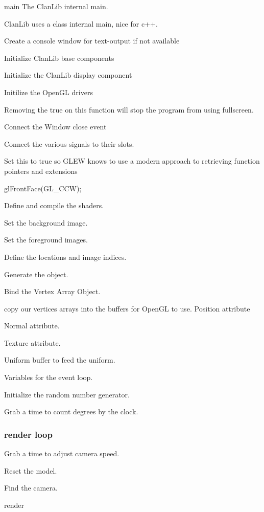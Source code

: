 main The Clan\+Lib internal main. 

Clan\+Lib uses a class internal main, nice for c++.

Create a console window for text-\/output if not available

Initialize Clan\+Lib base components

Initialize the Clan\+Lib display component

Initilize the Open\+GL drivers

Removing the true on this function will stop the program from using fullscreen.

Connect the Window close event

Connect the various signals to their slots.

Set this to true so G\+L\+EW knows to use a modern approach to retrieving function pointers and extensions

gl\+Front\+Face(\+G\+L\+\_\+\+C\+C\+W);

Define and compile the shaders.

Set the background image.

Set the foreground images.

Define the locations and image indices.

Generate the object.


\begin{DoxyEnumerate}
\item Bind the Vertex Array Object.
\item copy our vertices arrays into the buffers for Open\+GL to use. Position attribute
\end{DoxyEnumerate}

Normal attribute.

Texture attribute.

Uniform buffer to feed the uniform.

Variables for the event loop.

Initialize the random number generator.

Grab a time to count degrees by the clock.

\subsubsection*{render loop }

Grab a time to adjust camera speed.

Reset the model.

Find the camera.

render

